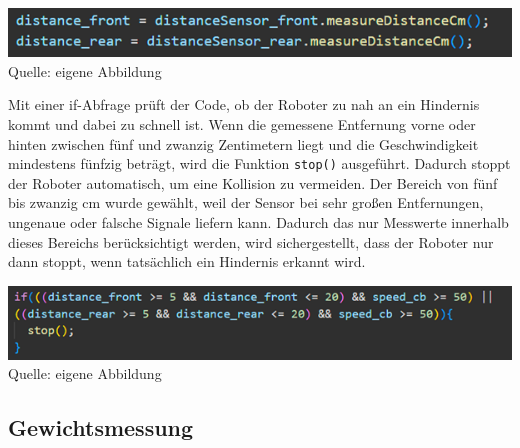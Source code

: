 \documentclass[ngerman,12pt,a4paper]{article}
\begin{document}
		\begin{center}
			\begin{minipage}{1\textwidth}
				\centering
				\includegraphics[width=\textwidth]{Pictures/code_hcsr04_messen}
				\label{fig:code_hcsr04_messen}
				\vspace{5pt}
				{\small Quelle: {eigene Abbildung}}
			\end{minipage}
		\end{center}
		\vspace{8pt}
		Mit einer if-Abfrage prüft der Code, ob der Roboter zu nah an ein Hindernis kommt und dabei zu schnell ist. Wenn die gemessene Entfernung vorne oder hinten zwischen fünf und zwanzig Zentimetern liegt und die Geschwindigkeit mindestens fünfzig beträgt, wird die Funktion \texttt{stop()} ausgeführt. Dadurch stoppt der Roboter automatisch, um eine Kollision zu vermeiden.
		\newpage\noindent
		Der Bereich von fünf bis zwanzig cm wurde gewählt, weil der Sensor bei sehr großen Entfernungen, ungenaue oder falsche Signale liefern kann. Dadurch das nur Messwerte innerhalb dieses Bereichs berücksichtigt werden, wird sichergestellt, dass der Roboter nur dann stoppt, wenn tatsächlich ein Hindernis erkannt wird.
		\begin{center}
			\begin{minipage}{1\textwidth}
				\centering
				\includegraphics[width=\textwidth]{Pictures/code_hcsr04_abfrage}
				\label{fig:code_hcsr04_abfrage}
				\vspace{5pt}
				{\small Quelle: {eigene Abbildung}}
			\end{minipage}
		\end{center}
		
		\vspace{-10pt}
		\subsection{Gewichtsmessung}
		\vspace{-3pt}
\end{document}
